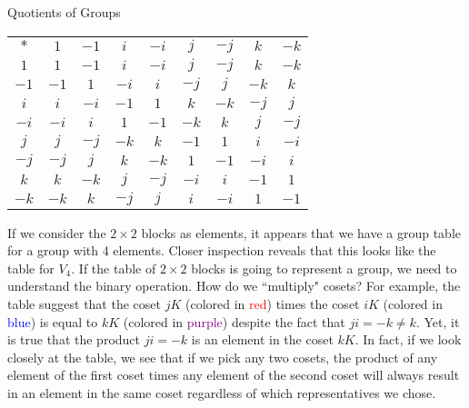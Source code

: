 \begin{section}{Quotients of Groups}
\begin{center}
\begin{tabular}{c!{\vrule width 2pt}c|c|c|c|c|c|c|c}
$*$ & $1$ & $-1$ & $i$ & $-i$ & $j$ & $-j$ & $k$ & $-k$ \\ 
$1$ & $1$ & $-1$ & $i$ & $-i$ & $j$ & $-j$ & $k$ & $-k$\\
\hline $-1$ & $-1$ & $1$ & $-i$ & $i$ & $-j$ & $j$ & $-k$ & $k$ \\
\hline $i$ & $i$ & $-i$ & $-1$ & $1$ & $k$ & $-k$ & $-j$ &  $j$\\
\hline $-i$ & $-i$ & $i$ & $1$ & $-1$ & $-k$ & $k$ & $j$ & $-j$\\
\hline $j$ & $j$ & $-j$ & $-k$ & $k$ & $-1$ & $1$ & $i$ & $-i$\\
\hline $-j$ & $-j$ & $j$ & $k$ & $-k$ & $1$ & $-1$ & $-i$ & $i$\\
\hline $k$ & $k$ & $-k$ & $j$ & $-j$ & $-i$ & $i$ & $-1$ & $1$\\
\hline $-k$ & $-k$ & $k$ & $-j$ & $j$ & $i$ & $-i$ & $1$ & $-1$
\end{tabular}
\end{center}

If we consider the $2\times 2$ blocks as elements, it appears that we have a group table for a group with 4 elements.  Closer inspection reveals that this looks like the table for $V_4$.  If the table of $2\times 2$ blocks is going to represent a group, we need to understand the binary operation.  How do we ``multiply" cosets?  For example, the table suggest that the coset $jK$ (colored in \textcolor{red}{red}) times the coset $iK$ (colored in \textcolor{blue}{blue}) is equal to $kK$ (colored in \textcolor{purple}{purple}) despite the fact that $ji=-k\neq k$.  Yet, it is true that the product $ji=-k$ is an element in the coset $kK$.  In fact, if we look closely at the table, we see that if we pick any two cosets, the product of any element of the first coset times any element of the second coset will always result in an element in the same coset regardless of which representatives we chose.


\end{section}
